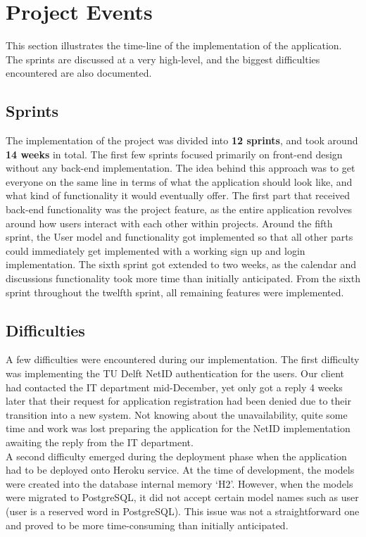 \section{Project Events}

This section illustrates the time-line of the implementation of the application. The sprints are discussed at a very high-level, and the biggest difficulties encountered are also documented.

\subsection{Sprints}

The implementation of the project was divided into \textbf{12 sprints}, and took around \textbf{14 weeks} in total. The first few sprints focused primarily on front-end design without any back-end implementation. The idea behind this approach was to get everyone on the same line in terms of what the application should look like, and what kind of functionality it would eventually offer. The first part that received back-end functionality was the project feature, as the entire application revolves around how users interact with each other within projects. Around the fifth sprint, the User model and functionality got implemented so that all other parts could immediately get implemented with a working sign up and login implementation. The sixth sprint got extended to two weeks, as the calendar and discussions functionality took more time than initially anticipated. From the sixth sprint throughout the twelfth sprint, all remaining features were implemented.
\newpage
\subsection{Difficulties}

A few difficulties were encountered during our implementation. The first difficulty was implementing the TU Delft NetID authentication for the users. Our client had contacted the IT department mid-December, yet only got a reply 4 weeks later that their request for application registration had been denied due to their transition into a new system. Not knowing about the unavailability, quite some time and work was lost preparing the application for the NetID implementation awaiting the reply from the IT department.\\

A second difficulty emerged during the deployment phase when the application had to be deployed onto Heroku service. At the time of development, the models were created into the database internal memory `H2'. However, when the models were migrated to PostgreSQL, it did not accept certain model names such as user (user is a reserved word in PostgreSQL). This issue was not a straightforward one and proved to be more time-consuming than initially anticipated.